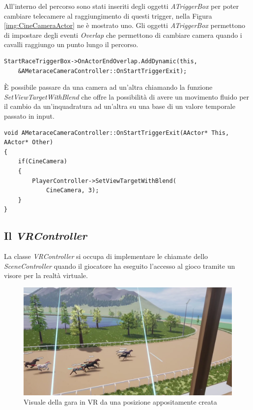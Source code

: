     All'interno del percorso sono stati inseriti degli oggetti \textit{ATriggerBox} per poter cambiare telecamere al raggiungimento di questi trigger, nella Figura \ref{img:CineCameraActor} ne è mostrato uno.
    Gli oggetti \textit{ATriggerBox} permettono di impostare degli eventi \textit{Overlap} che permettono di cambiare camera quando i cavalli raggiungo un punto lungo il percorso.

    \begin{lstlisting}[caption = {Chiamata per l'aggiunta di una funzione all'evento overlap di un \textit{TriggerBox}}]
StartRaceTriggerBox->OnActorEndOverlap.AddDynamic(this, 
    &AMetaraceCameraController::OnStartTriggerExit);
    \end{lstlisting}

    È possibile passare da una camera ad un'altra chiamando la funzione \textit{SetViewTargetWithBlend} che offre la possibilità di avere un movimento fluido per il cambio da un'inquadratura ad un'altra su una base di un valore temporale passato in input.

    \begin{lstlisting}[caption = Funzione per impostare la telecamera per la vista dell'utente]
void AMetaraceCameraController::OnStartTriggerExit(AActor* This, AActor* Other)
{
    if(CineCamera)
    {
        PlayerController->SetViewTargetWithBlend(
            CineCamera, 3); 
    }
}
    \end{lstlisting}

    \subsection{Il \textit{VRController}}

    La classe \textit{VRController} si occupa di implementare le chiamate dello \textit{SceneController} quando il giocatore ha eseguito l'accesso al gioco tramite un visore per la realtà virtuale.

    \begin{figure}[!ht]
        \centering
        \includegraphics[width=12cm]{figure/VRVisuale.png}
        \caption{Visuale della gara in VR da una posizione appositamente creata}
    \end{figure}


